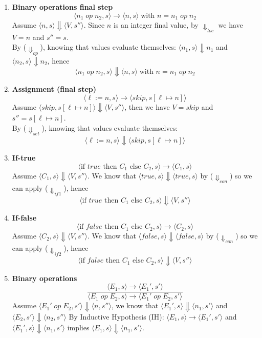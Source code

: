 \begin{solution}
\begin{enumerate}[label=(\alph*)]
\begin{enumerate}[label=(\alph{enumi}).\arabic*]
\item \textbf{Binary operations final step}
 \[ \langle n_1 \; op\; n_2, s\rangle \to \langle n,s\rangle \; \text{with } n = n_1\;op\;n_2\]
 Assume $\langle n,s\rangle \Downarrow \langle V,s''\rangle$. Since $n$ is an integer final value, by $\Downarrow_{loc}$ we have $V = n$ and $s''=s$. 
\\
By ($\Downarrow_{op}$), knowing that values evaluate themselves: $\langle n_1,s\rangle \Downarrow n_1$ and $\langle n_2,s\rangle \Downarrow n_2$, hence 
 \[ \langle n_1 \; op\; n_2, s\rangle \Downarrow \langle n,s\rangle \; \text{with } n = n_1\;op\;n_2\]
  \item \textbf{Assignment (final step)}
 \[ \langle \ell := n, s\rangle \to \langle skip, s[\ell\mapsto n]\rangle\]
Assume $\langle skip, s[\ell\mapsto n]\rangle \Downarrow \langle V,s''\rangle$, then we have $V = skip$ and $s''=s[\ell\mapsto n]$. 
\\
By ($\Downarrow_{set}$),  knowing that values evaluate themselves:
 \[ \langle \ell := n, s\rangle \Downarrow \langle skip, s[\ell\mapsto n]\rangle\]
\item \textbf{If-true}
 \[ \langle \text{if }true \text{ then }C_1 \text{ else }C_2, s\rangle \to \langle C_1,s\rangle\]
Assume $\langle C_1,s\rangle \Downarrow \langle V,s''\rangle$.
We know that $\langle true,s\rangle \Downarrow \langle true,s\rangle$ by ($\Downarrow_{con}$) so we can apply ($\Downarrow_{if1}$), hence  
\[ \langle \text{if }true \text{ then }C_1 \text{ else }C_2, s\rangle \Downarrow  \langle V,s''\rangle\]
\item \textbf{If-false}
 \[ \langle \text{if }false \text{ then }C_1 \text{ else }C_2, s\rangle \to \langle C_2,s\rangle\]
Assume $\langle C_2,s\rangle \Downarrow \langle V,s''\rangle$.
We know that $\langle false,s\rangle \Downarrow \langle false,s\rangle$ by ($\Downarrow_{con}$) so we can apply ($\Downarrow_{if2}$), hence  
\[ \langle \text{if }false \text{ then }C_1 \text{ else }C_2, s\rangle \Downarrow  \langle V,s''\rangle\]
\item \textbf{Binary operations}
 \[ \frac{\langle E_1,s\rangle\to\langle E_1',s'\rangle}{\langle E_1 \; op\; E_2, s\rangle \to \langle E_1' \; op\; E_2, s'\rangle}\]
 Assume $\langle E_1' \; op\; E_2, s'\rangle \Downarrow \langle n,s''\rangle$, we know that $\langle E_1',s\rangle \Downarrow  \langle n_1, s'\rangle$ and $\langle E_2,s'\rangle \Downarrow  \langle n_2, s''\rangle$
 By Inductive Hypothesis (IH): $\langle E_1,s\rangle\to\langle E_1',s'\rangle$ and $\langle E_1',s\rangle \Downarrow  \langle n_1, s'\rangle$ implies $\langle E_1,s\rangle \Downarrow  \langle n_1, s'\rangle$.

\end{enumerate}
\end{enumerate}
\end{solution}

